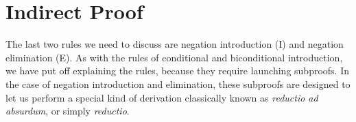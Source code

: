 \begin{enumerate}[label=(\arabic*)]


\end{enumerate}




\section{Indirect Proof}
\label{sec:indirect_proof}


The last two rules we need to discuss are negation introduction (\enot I)  and negation elimination (\enot E). As with the rules of conditional and biconditional introduction, we have put off explaining the rules, because they require launching subproofs. In the case of negation introduction and elimination, these subproofs are designed to let us perform a special kind of derivation classically known as \emph{reductio ad absurdum}, or simply \emph{reductio}. 

